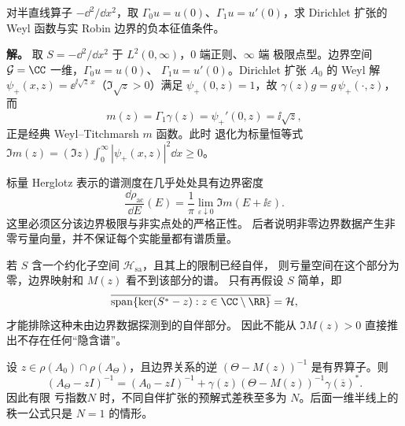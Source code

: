 \begin{example}
对半直线算子 $-\dd^2/\dd x^2$，取 $\Gamma_0u=u(0)$、$\Gamma_1u=u\prime(0)$，求 Dirichlet 扩张的 Weyl 函数与实 Robin 边界的负本征值条件。

\textbf{解。} 取 $S=-\dd^2/\dd x^2$ 于 $L^2(0,\infty)$，$0$ 端正则、$\infty$ 端
极限点型。边界空间 $\mathcal G=\CC$ 一维，$\Gamma_0u=u(0)$、
$\Gamma_1u=u'(0)$。Dirichlet 扩张 $A_0$ 的 Weyl 解
$\psi_+(x,z)=\ee^{\ii\sqrt z\,x}$（$\Im\sqrt z>0$）满足 $\psi_+(0,z)=1$，故
$\gamma(z)g=g\,\psi_+(\cdot,z)$，而
\[
 m(z)=\Gamma_1\gamma(z)=\psi_+'(0,z)=\ii\sqrt z,
\]
正是经典 Weyl--Titchmarsh $m$ 函数。此时
退化为标量恒等式 $\Im m(z)=(\Im z)\int_0^\infty|\psi_+(x,z)|^2\dd x\ge0$。
\end{example}

\begin{note}[正性能够确定哪些谱信息]
标量 Herglotz 表示的谱测度在几乎处处具有边界密度
\[
\frac{\dd\rho_{\mathrm{ac}}}{\dd E}(E)
=\frac1\pi\lim_{\varepsilon\downarrow0}\Im m(E+\ii\varepsilon).
\]
这里必须区分该边界极限与非实点处的严格正性。
后者说明非零边界数据产生非零亏量向量，并不保证每个实能量都有谱质量。

若 $S$ 含一个约化子空间 $\mathcal H_{\mathrm{sa}}$，且其上的限制已经自伴，
则亏量空间在这个部分为零，边界映射和 $M(z)$ 看不到该部分的谱。
只有再假设 $S$ 简单，即
\[
\overline{\operatorname{span}\{\ker(S^*-z):z\in\CC\setminus\RR\}}
=\mathcal H,
\]
才能排除这种未由边界数据探测到的自伴部分。
因此不能从 $\Im M(z)>0$ 直接推出不存在任何“隐含谱”。
\end{note}

\begin{theorem}
设 $z\in\rho(A_0)\cap\rho(A_\Theta)$，且边界关系的逆 $(\Theta-M(z))^{-1}$ 是有界算子。则
\begin{equation}\label{eq:math-sl-krein-resolvent-abstract}
 (A_\Theta-zI)^{-1}
 =(A_0-zI)^{-1}
 +\gamma(z)(\Theta-M(z))^{-1}\gamma(\overline z)^*.
\end{equation}
因此有限 亏指数$N$ 时，不同自伴扩张的预解式差秩至多为 $N$。后面一维半线上的秩一公式只是 $N=1$ 的情形。
\end{theorem}

